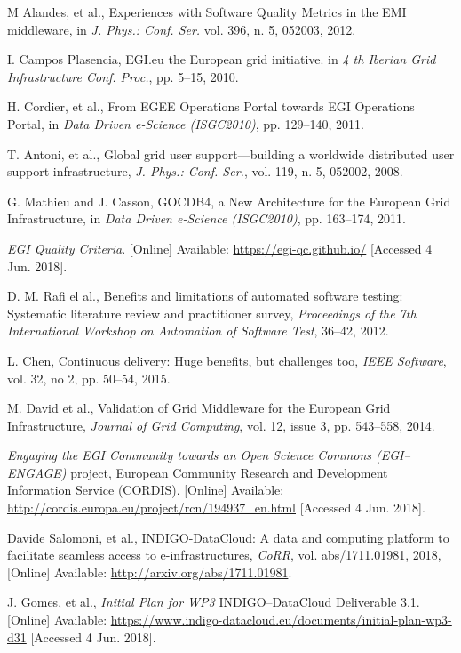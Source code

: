\documentclass[journal]{IEEEtran}
\begin{document}
\begin{thebibliography}{1}
M Alandes, et al.,
Experiences with Software Quality Metrics in the EMI middleware,
in \emph{J. Phys.: Conf. Ser.}
vol. 396, n. 5, 052003, 2012.

I. Campos Plasencia,
EGI.eu the European grid initiative.
in \emph{4 th Iberian Grid Infrastructure Conf. Proc.},
pp. 5--15, 2010.

H. Cordier, et al.,
From EGEE Operations Portal towards EGI Operations Portal,
in \emph{Data Driven e-Science (ISGC2010)},
pp. 129--140, 2011.

T. Antoni, et al.,
Global grid user support—building a worldwide distributed user support infrastructure,
\emph{J. Phys.: Conf. Ser.},
vol. 119, n. 5, 052002, 2008.

G. Mathieu and J. Casson,
GOCDB4, a New Architecture for the European Grid Infrastructure,
in \emph{Data Driven e-Science (ISGC2010)},
pp. 163--174, 2011.

\emph{EGI Quality Criteria}.
[Online] Available: \url{https://egi-qc.github.io/}
[Accessed 4 Jun. 2018].

D. M. Rafi el al.,
Benefits and limitations of automated software testing: Systematic literature review and practitioner survey,
\emph{Proceedings of the 7th International Workshop on Automation of Software Test},
36--42, 2012.

L. Chen,
Continuous delivery: Huge benefits, but challenges too,
\emph{IEEE Software},
vol. 32, no 2, pp. 50--54, 2015.

M. David et al.,
Validation of Grid Middleware for the European Grid Infrastructure,
\emph{Journal of Grid Computing},
vol. 12, issue 3, pp. 543--558, 2014.

\emph{Engaging the EGI Community towards an Open Science Commons (EGI--ENGAGE)}
project, European Community Research and Development Information Service (CORDIS).
[Online] Available: \url{http://cordis.europa.eu/project/rcn/194937\_en.html}
[Accessed 4 Jun. 2018].

Davide Salomoni, et al.,
INDIGO-DataCloud: {A} data and computing platform to facilitate seamless access to e-infrastructures,
\emph{CoRR},
vol. abs/1711.01981, 2018,
[Online] Available: \url{http://arxiv.org/abs/1711.01981}.

J. Gomes, et al.,
\emph{Initial Plan for WP3} INDIGO--DataCloud Deliverable 3.1.
[Online] Available: \url{https://www.indigo-datacloud.eu/documents/initial-plan-wp3-d31}
[Accessed 4 Jun. 2018].


\end{thebibliography}
\end{document}
